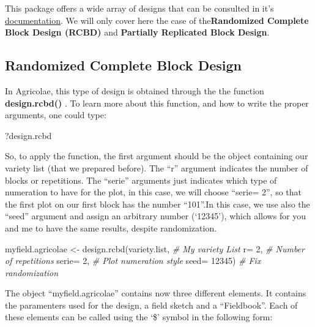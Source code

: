 \documentclass[
]{book}
\newenvironment{Shaded}{\begin{snugshade}}{\end{snugshade}}
\newcommand{\AttributeTok}[1]{\textcolor[rgb]{0.77,0.63,0.00}{#1}}
\newcommand{\CommentTok}[1]{\textcolor[rgb]{0.56,0.35,0.01}{\textit{#1}}}
\newcommand{\DecValTok}[1]{\textcolor[rgb]{0.00,0.00,0.81}{#1}}
\newcommand{\FunctionTok}[1]{\textcolor[rgb]{0.00,0.00,0.00}{#1}}
\newcommand{\NormalTok}[1]{#1}
\newcommand{\OtherTok}[1]{\textcolor[rgb]{0.56,0.35,0.01}{#1}}
\begin{document}
This package offers a wide array of designs that can be consulted in it's \href{https://cran.r-project.org/web/packages/agricolae/agricolae.pdf}{documentation}. We will only cover here the case of the\textbf{Randomized Complete Block Design (RCBD) } and \textbf{Partially Replicated Block Design}.

\hypertarget{randomized-complete-block-design-1}{%
\subsection{Randomized Complete Block Design}\label{randomized-complete-block-design-1}}

In Agricolae, this type of design is obtained through the the function \textbf{design.rcbd() }. To learn more about this function, and how to write the proper arguments, one could type:

\begin{Shaded}
\begin{Highlighting}[]
\NormalTok{?design.rcbd}
\end{Highlighting}
\end{Shaded}

So, to apply the function, the first argument should be the object containing our variety list (that we prepared before). The ``r'' argument indicates the number of blocks or repetitions. The ``serie'' arguments just indicates which type of numeration to have for the plot, in this case, we will choose ``serie= 2'', so that the first plot on our first block has the number ``101''.In this case, we use also the ``seed'' argument and assign an arbitrary number (`12345'), which allows for you and me to have the same results, despite randomization.

\begin{Shaded}
\begin{Highlighting}[]
\NormalTok{myfield.agricolae }\OtherTok{\textless{}{-}} \FunctionTok{design.rcbd}\NormalTok{(variety.list,        }\CommentTok{\# My variety List}
                     \AttributeTok{r=} \DecValTok{2}\NormalTok{,                }\CommentTok{\# Number of repetitions}
                     \AttributeTok{serie=} \DecValTok{2}\NormalTok{,            }\CommentTok{\# Plot numeration style}
                     \AttributeTok{seed=} \DecValTok{12345}\NormalTok{)         }\CommentTok{\# Fix randomization}
\end{Highlighting}
\end{Shaded}

The object ``myfield.agricolae'' contains now three different elements. It contains the paramenters used for the design, a field sketch and a ``Fieldbook''. Each of these elements can be called using the `\$' symbol in the following form:
\end{document}
